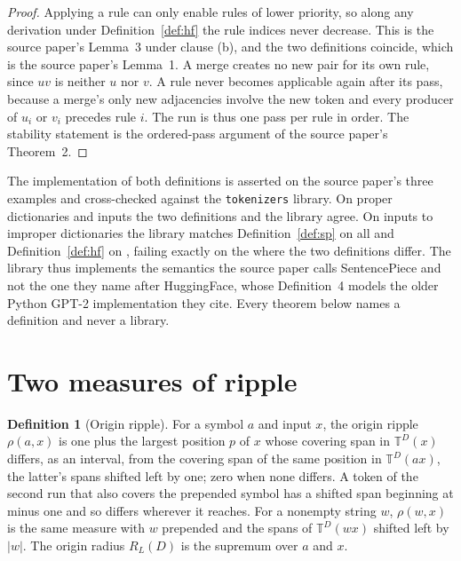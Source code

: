 \documentclass[11pt,a4paper]{article}
\theoremstyle{definition}
\newtheorem{definition}{Definition}
\theoremstyle{plain}
\newcommand{\code}[1]{\texttt{#1}}
\newcommand{\T}{\mathbb{T}}
\newcommand{\ripple}{R_{L}}
\begin{document}
\begin{proof}
Applying a rule can only enable rules of lower priority, so along any derivation under Definition~\ref{def:hf} the rule
indices never decrease. This is the source paper's Lemma~3 under clause (b), and the two definitions coincide, which is
the source paper's Lemma~1. A merge creates no new pair for its own rule, since \(uv\) is neither \(u\) nor \(v\). A
rule never becomes applicable again after its pass, because a merge's only new adjacencies involve the new token and
every producer of \(u_i\) or \(v_i\) precedes rule \(i\). The run is thus one pass per rule in order. The stability
statement is the ordered-pass argument of the source paper's Theorem~2.
\end{proof}

The implementation of both definitions is asserted on the source paper's three examples and cross-checked against the
\code{tokenizers} library. On \CrossDictionaries{} proper dictionaries and \CrossInputs{} inputs the two definitions and
the library agree. On \CrossImproperInputs{} inputs to improper dictionaries the library matches Definition~\ref{def:sp}
on all \CrossDefThree{} and Definition~\ref{def:hf} on \CrossDefFour{}, failing exactly on the \CrossDiffer{} where the
two definitions differ. The library thus implements the semantics the source paper calls SentencePiece and not the one
they name after HuggingFace, whose Definition~4 models the older Python GPT-2 implementation they cite. Every theorem
below names a definition and never a library.

\section{Two measures of ripple}\label{sec:measures}


\begin{definition}[Origin ripple]\label{def:origin}
For a symbol \(a\) and input \(x\), the origin ripple \(\rho(a, x)\) is one plus the largest position \(p\) of \(x\)
whose covering span in \(\T^D(x)\) differs, as an interval, from the covering span of the same position in \(\T^D(ax)\),
the latter's spans shifted left by one; zero when none differs. A token of the second run that also covers the prepended
symbol has a shifted span beginning at minus one and so differs wherever it reaches. For a nonempty string \(w\),
\(\rho(w, x)\) is the same measure with \(w\) prepended and the spans of \(\T^D(wx)\) shifted left by \(|w|\). The
origin radius \(\ripple(D)\) is the supremum over \(a\) and \(x\).
\end{definition}
\end{document}
